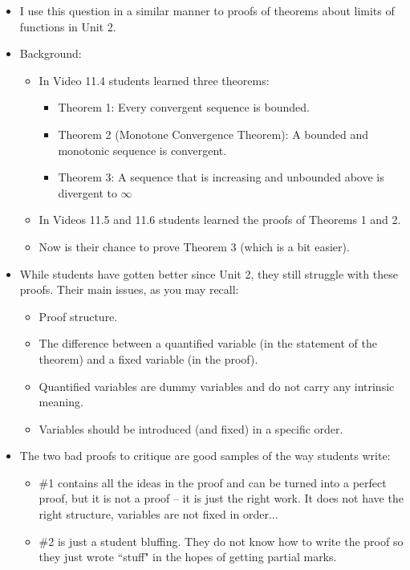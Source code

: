 \documentclass[11pt]{article}
\newcommand{\nl}{\hfill \vspace{-1.1\baselineskip}} %
\begin{document}
\begin{comments}
\nl
	\begin{itemize}
		\item I use this question in a similar manner to proofs of theorems about limits of functions in Unit 2.
		\item  Background:
			\begin{itemize}
				\item  In Video 11.4 students learned three theorems:
					\begin{itemize}
						\item  Theorem 1:  Every convergent sequence is bounded.
						\item  Theorem 2 (Monotone Convergence Theorem): A bounded and monotonic sequence is convergent.
						\item  Theorem 3: A sequence that is increasing and unbounded above is divergent to $\infty$
					\end{itemize}
				\item In Videos 11.5 and 11.6 students learned the proofs of Theorems 1 and 2.
				\item Now is their chance to prove Theorem 3 (which is a bit easier).
			\end{itemize}
		\item While students have gotten better since Unit 2, they still struggle with these proofs.    Their main issues, as you may recall:
			\begin{itemize}
				\item  Proof structure.
				\item  The difference between a quantified variable (in the statement of the theorem) and a fixed variable (in the proof).
				\item Quantified variables are dummy variables and do not carry any intrinsic meaning.
				\item Variables should be introduced (and fixed) in a specific order.
			\end{itemize}
		\item The two bad proofs to critique are good samples of the way students write:
			\begin{itemize}
				\item \#1 contains all the ideas in the proof and can be turned into a perfect proof, but it is not a proof -- it is just the right work.  It does not have the right structure, variables are not fixed in order...
				\item \#2 is just a student bluffing.  They do not know how to write the proof so they just wrote ``stuff" in the hopes of getting partial marks.
			\end{itemize}
	\end{itemize}
\end{comments}
\end{document}

